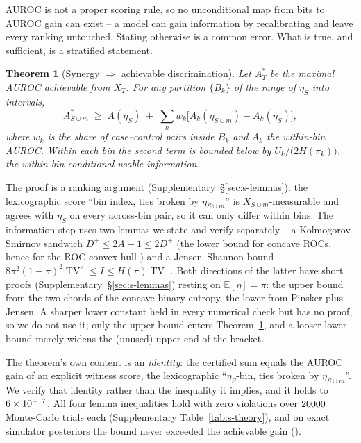\documentclass[11pt]{article}
\newtheorem{theorem}{Theorem}
\theoremstyle{definition}
\theoremstyle{remark}
\DeclareMathOperator{\TV}{TV}
\begin{document}
AUROC is not a proper scoring rule, so no unconditional map from bits to AUROC
gain can exist -- a model can gain information by recalibrating and leave every
ranking untouched. Stating otherwise is a common error. What is true, and
sufficient, is a stratified statement.

\begin{theorem}[Synergy $\Rightarrow$ achievable discrimination]
\label{thm:auroc}
Let $A^*_T$ be the maximal AUROC achievable from $X_T$. For any partition
$\{B_k\}$ of the range of $\eta_S$ into intervals,
\[
A^*_{S\cup m} \;\ge\; A(\eta_S) \;+\; \sum_k w_k\big[A_k(\eta_{S\cup m}) - A_k(\eta_S)\big],
\]
where $w_k$ is the share of case--control pairs inside $B_k$ and $A_k$ the
within-bin AUROC. Within each bin the second term is bounded below by
$U_k / \big(2H(\pi_k)\big)$, the within-bin conditional usable information.
\end{theorem}

The proof is a ranking argument (Supplementary~\S\ref{sec:s-lemmas}): the lexicographic score
``bin index, ties broken by $\eta_{S\cup m}$'' is $X_{S\cup m}$-measurable and
agrees with $\eta_S$ on every across-bin pair, so it can only differ within bins.
The information step uses two lemmas we state and verify separately -- a
Kolmogorov--Smirnov sandwich $D^+ \le 2A-1 \le 2D^+$ (the lower bound for
concave ROCs, hence for the ROC convex hull \citep{provost2001robust}) and a
Jensen--Shannon bound $8\pi^2(1-\pi)^2\TV^2 \le I \le H(\pi)\TV$
\citep{lin1991divergence}. Both directions of the latter have short proofs
(Supplementary~\S\ref{sec:s-lemmas}) resting on $\mathbb{E}[\eta]=\pi$: the upper bound from the
two chords of the concave binary entropy, the lower from Pinsker plus Jensen. A
sharper lower constant held in every numerical check but has no proof, so we do
not use it; only the upper bound enters Theorem~\ref{thm:auroc}, and a looser
lower bound merely widens the (unused) upper end of the bracket.

The theorem's own content is an \emph{identity}: the certified sum equals the
AUROC gain of an explicit witness score, the lexicographic
``$\eta_S$-bin, ties broken by $\eta_{S\cup m}$''. We verify that identity
rather than the inequality it implies, and it holds to $6\times10^{-17}$. All
four lemma inequalities hold with zero violations over $20000$
Monte-Carlo trials each (Supplementary Table~\ref{tab:s-theory}), and on exact simulator
posteriors the bound never exceeded the achievable gain (\simThmOneHolds).
\end{document}
